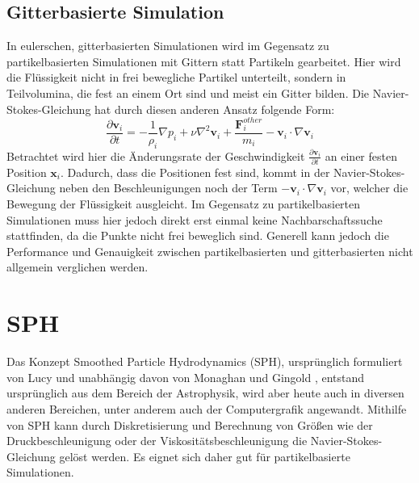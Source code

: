 \documentclass[11pt,
a4paper,
parskip=half, %
BCOR=10mm, %
english,
ngerman]{scrreprt}
\begin{document}
\subsection{Gitterbasierte Simulation}
In eulerschen, gitterbasierten Simulationen wird im Gegensatz zu partikelbasierten Simulationen mit Gittern statt Partikeln gearbeitet.
Hier wird die Flüssigkeit nicht in frei bewegliche Partikel unterteilt, sondern in Teilvolumina, die fest an einem Ort sind und meist ein Gitter bilden.
Die Navier-Stokes-Gleichung hat durch diesen anderen Ansatz folgende Form:
\begin{equation}
    \frac{\partial\textbf{v}_i}{\partial t} = -\frac{1}{\rho_i} \nabla p_i + \nu \nabla^2 \textbf{v}_i + \frac{\textbf{F}_i^{other}}{m_i} - \textbf{v}_i \cdot \nabla \textbf{v}_i
\end{equation}
Betrachtet wird hier die Änderungsrate der Geschwindigkeit $\frac{\partial\textbf{v}_i}{\partial t}$ an einer festen Position $\textbf{x}_i$.
Dadurch, dass die Positionen fest sind,
kommt in der Navier-Stokes-Gleichung neben den Beschleunigungen noch der Term $- \textbf{v}_i \cdot \nabla \textbf{v}_i$ vor,
welcher die Bewegung der Flüssigkeit ausgleicht.
Im Gegensatz zu partikelbasierten Simulationen muss hier jedoch direkt erst einmal keine Nachbarschaftssuche stattfinden,
da die Punkte nicht frei beweglich sind.
Generell kann jedoch die Performance und Genauigkeit zwischen partikelbasierten und gitterbasierten nicht allgemein verglichen werden.


\section{SPH}
Das Konzept Smoothed Particle Hydrodynamics (SPH),
ursprünglich formuliert von Lucy \cite{lucy_numerical_1977} und unabhängig davon von Monaghan und Gingold \cite{gingold_smoothed_1977},
entstand ursprünglich aus dem Bereich der Astrophysik, wird aber heute auch in diversen anderen Bereichen,
unter anderem auch der Computergrafik angewandt.
Mithilfe von SPH kann durch Diskretisierung und Berechnung von Größen wie der Druckbeschleunigung oder der Viskositätsbeschleunigung
die Navier-Stokes-Gleichung gelöst werden.
Es eignet sich daher gut für partikelbasierte Simulationen.
\end{document}
